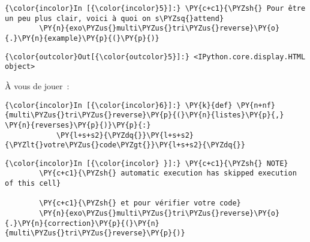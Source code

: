     \begin{Verbatim}[commandchars=\\\{\}]
{\color{incolor}In [{\color{incolor}5}]:} \PY{c+c1}{\PYZsh{} Pour être un peu plus clair, voici à quoi on s\PYZsq{}attend}
        \PY{n}{exo\PYZus{}multi\PYZus{}tri\PYZus{}reverse}\PY{o}{.}\PY{n}{example}\PY{p}{(}\PY{p}{)}
\end{Verbatim}


\begin{Verbatim}[commandchars=\\\{\}]
{\color{outcolor}Out[{\color{outcolor}5}]:} <IPython.core.display.HTML object>
\end{Verbatim}
            
    À vous de jouer~:

    \begin{Verbatim}[commandchars=\\\{\}]
{\color{incolor}In [{\color{incolor}6}]:} \PY{k}{def} \PY{n+nf}{multi\PYZus{}tri\PYZus{}reverse}\PY{p}{(}\PY{n}{listes}\PY{p}{,} \PY{n}{reverses}\PY{p}{)}\PY{p}{:}
            \PY{l+s+s2}{\PYZdq{}}\PY{l+s+s2}{\PYZlt{}votre\PYZus{}code\PYZgt{}}\PY{l+s+s2}{\PYZdq{}}
\end{Verbatim}


    \begin{Verbatim}[commandchars=\\\{\}]
{\color{incolor}In [{\color{incolor} }]:} \PY{c+c1}{\PYZsh{} NOTE}
        \PY{c+c1}{\PYZsh{} automatic execution has skipped execution of this cell}
        
        \PY{c+c1}{\PYZsh{} et pour vérifier votre code}
        \PY{n}{exo\PYZus{}multi\PYZus{}tri\PYZus{}reverse}\PY{o}{.}\PY{n}{correction}\PY{p}{(}\PY{n}{multi\PYZus{}tri\PYZus{}reverse}\PY{p}{)}
\end{Verbatim}



    
    
    
